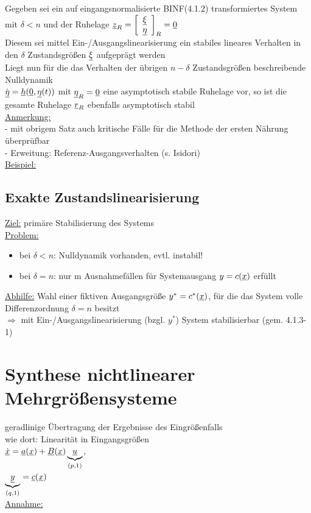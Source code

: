 \documentclass[openany,a4paper,11pt]{book}
\begin{document}
\begin{itemize}
    Gegeben sei ein auf eingangsnormalisierte BINF(4.1.2) transformiertes System mit $\delta<n$ und der Ruhelage $\uline{z}_R=\left[ \begin{array}{c} \uline{\xi}\\ \uline{\eta}\\ \end{array} \right]_R=\uline{0}$\\
    Diesem sei mittel Ein-/Ausgangslinearisierung ein stabiles lineares Verhalten in den $\delta$ Zustandsgrößen $\uline{\xi}$ aufgeprägt werden\\
    Liegt nun für die das Verhalten der übrigen $n-\delta$ Zustandsgrößen beschreibende Nulldynamik\\
    $\dot{\uline{\eta}}=\uline{h}(\uline{0},\uline{\eta}(t))$ mit $\uline{\eta}_R=\uline{0}$ eine asymptotisch stabile Ruhelage vor, so ist die gesamte Ruhelage $\uline{r}_R$ ebenfalls asymptotisch stabil\\
    \uline{Anmerkung:}\\
        - mit obrigem Satz auch kritische Fälle für die Methode der ersten Nährung überprüfbar\\
        - Erweitung: Referenz-Ausgangsverhalten (s. Isidori)\\
    \uline{Beispiel:} 
\end{itemize}
\subsection{Exakte Zustandslinearisierung}
\uline{Ziel:} primäre Stabilisierung des Systems\\
\uline{Problem:} \begin{itemize}
    \item bei $\delta<n$: Nulldynamik vorhanden, evtl. instabil!
    \item bei $\delta=n$: nur m Ausnahmefällen für Systemausgang $y=c(\uline{x})$ erfüllt 
\end{itemize}
\uline{Abhilfe:} Wahl einer fiktiven Ausgangsgröße $y^*=c^*(\uline{x})$, für die das System volle Differenzordnung $\delta=n$ besitzt\\
$\Rightarrow$ mit Ein-/Ausgangslinearisierung (bzgl. $y^*$) System stabilisierbar (gem. 4.1.3-1)
\section[Mehrgrößensysteme]{Synthese nichtlinearer Mehrgrößensysteme}
geradlinige Übertragung der Ergebnisse des Eingrößenfalls\\
wie dort: Linearität in Eingangsgrößen\\
$\uline{\dot{x}}=\uline{a}(\uline{x})+\uline{B}(\uline{x})\underbrace{\uline{u}}_{(p,1)}$, \\$\underbrace{\uline{y}}_{(q,1)}=\uline{c}(\uline{x})$\\
\uline{Annahme:} 
\end{document}
